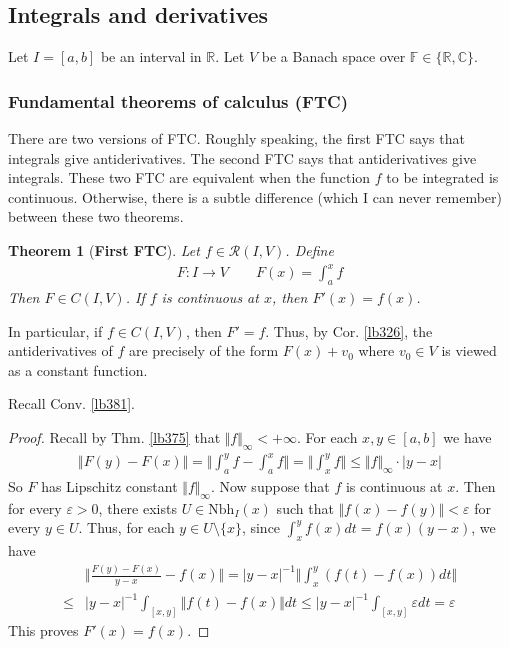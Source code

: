 \documentclass[12pt,b5paper,notitlepage]{article}
\theoremstyle{definition}
\theoremstyle{plain}
\newtheorem{thm}[df]{Theorem}
\newcommand{\scr}{\mathscr}
\newcommand{\Cbb}{\mathbb C}
\newcommand{\Rbb}{\mathbb R}
\newcommand{\Fbb}{\mathbb F}
\newcommand{\Nbh}{\mathrm{Nbh}}
\newcommand{\eps}{\varepsilon}
\numberwithin{equation}{section}
\begin{document}
\subsection{Integrals and derivatives}




Let $I=[a,b]$ be an interval in $\Rbb$. Let $V$ be a Banach space over $\Fbb\in\{\Rbb,\Cbb\}$.


\subsubsection{Fundamental theorems of calculus (FTC)} 


There are two versions of FTC. Roughly speaking, the first FTC says that integrals give antiderivatives. The second FTC says that antiderivatives give integrals. These two FTC are equivalent when the function $f$ to be integrated is continuous. Otherwise, there is a subtle difference (which I can never remember) between these two theorems. 


\begin{thm}[\textbf{First FTC}]\label{lb390}
Let $f\in\scr R(I,V)$. Define
\begin{gather}
F:I\rightarrow V\qquad F(x)=\int_a^x f
\end{gather}
Then $F\in C(I,V)$. If $f$ is continuous at $x$, then $F'(x)=f(x)$.
\end{thm}

In particular, if $f\in C(I,V)$, then $F'=f$. Thus, by Cor. \ref{lb326}, the antiderivatives of $f$ are precisely of the form $F(x)+v_0$ where $v_0\in V$ is viewed as a constant function. 


Recall Conv. \ref{lb381}.

\begin{proof}
Recall by Thm. \ref{lb375} that $\Vert f\Vert_\infty<+\infty$. For each $x,y\in[a,b]$ we have
\begin{align*}
\Vert F(y)-F(x)\Vert=\Big\Vert\int_a^y f-\int_a^x f \Big\Vert=\Big\Vert\int_x^y f \Big\Vert\leq \Vert f\Vert_\infty\cdot|y-x|
\end{align*}
So $F$ has Lipschitz constant $\Vert f\Vert_\infty$. Now suppose that $f$ is continuous at $x$. Then for every $\eps>0$, there exists $U\in\Nbh_I(x)$ such that $\Vert f(x)-f(y)\Vert<\eps$ for every $y\in U$. Thus, for each $y\in U\setminus\{x\}$, since $\int_x^y f(x)dt=f(x)(y-x)$, we have
\begin{align*}
&\Big\Vert \frac{F(y)-F(x)}{y-x}-f(x)\Big\Vert=|y-x|^{-1}\Big\Vert \int_x^y (f(t)-f(x))dt\Big\Vert\\
\leq& |y-x|^{-1}\int_{[x,y]}\Vert f(t)-f(x)\Vert dt\leq |y-x|^{-1}\int_{[x,y]}\eps dt=\eps
\end{align*}
This proves $F'(x)=f(x)$.
\end{proof}
\end{document}
